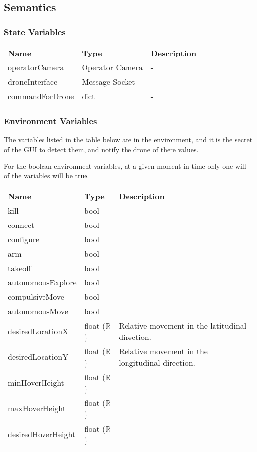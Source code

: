 \documentclass[12pt, titlepage]{article}
\begin{document}
\subsection{Semantics}
\subsubsection{State Variables}
\begin{center}
\begin{tabular}{p{4 cm} p{4cm} p{5cm} }
\hline
\textbf{Name} & \textbf{Type} & \textbf{Description}  \\
operatorCamera & Operator Camera & - \\
droneInterface & Message Socket & - \\
commandForDrone & dict & - \\
\hline
\hline
\end{tabular}
\end{center}
\subsubsection{Environment Variables}
The variables listed in the table below are in the environment, and it is the secret of the GUI to detect them, and notify the drone of there values. 

For the boolean environment variables, at a given moment in time only one will of the variables will be true.
\begin{center}
\begin{tabular}{p{4 cm} p{4cm} p{5cm} }
\hline
\textbf{Name} & \textbf{Type} & \textbf{Description}  \\
kill & bool &  \\
connect & bool &  \\
configure & bool &  \\
arm & bool &  \\
takeoff & bool &  \\
autonomousExplore & bool &  \\
compulsiveMove & bool &  \\
autonomousMove & bool &  \\
desiredLocationX & float ($\mathbb{R}$) & Relative movement in the latitudinal direction. \\
desiredLocationY & float ($\mathbb{R}$) & Relative movement in the longitudinal direction. \\
minHoverHeight & float ($\mathbb{R}$) &  \\
maxHoverHeight & float ($\mathbb{R}$) &  \\
desiredHoverHeight & float ($\mathbb{R}$) &  \\
\hline
\hline
\end{tabular}
\end{center}
\end{document}
